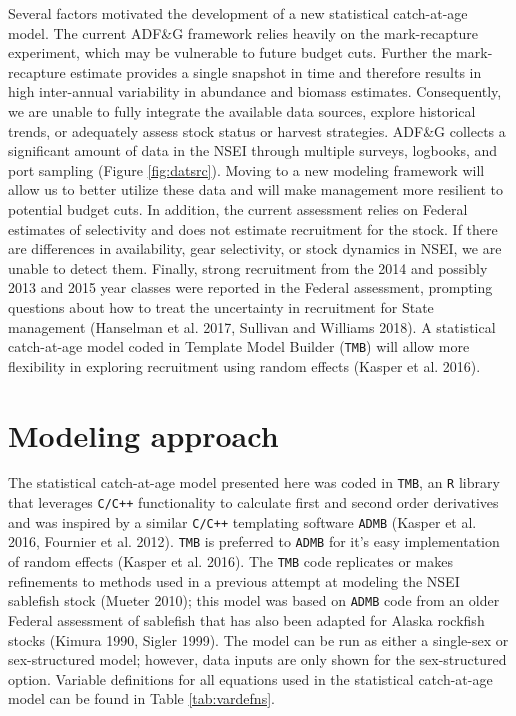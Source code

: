 \documentclass[]{article}
\begin{document}
Several factors motivated the development of a new statistical
catch-at-age model. The current ADF\&G framework relies heavily on the
mark-recapture experiment, which may be vulnerable to future budget
cuts. Further the mark-recapture estimate provides a single snapshot in
time and therefore results in high inter-annual variability in abundance
and biomass estimates. Consequently, we are unable to fully integrate
the available data sources, explore historical trends, or adequately
assess stock status or harvest strategies. ADF\&G collects a significant
amount of data in the NSEI through multiple surveys, logbooks, and port
sampling (Figure \ref{fig:datsrc}). Moving to a new modeling framework
will allow us to better utilize these data and will make management more
resilient to potential budget cuts. In addition, the current assessment
relies on Federal estimates of selectivity and does not estimate
recruitment for the stock. If there are differences in availability,
gear selectivity, or stock dynamics in NSEI, we are unable to detect
them. Finally, strong recruitment from the 2014 and possibly 2013 and
2015 year classes were reported in the Federal assessment, prompting
questions about how to treat the uncertainty in recruitment for State
management (Hanselman et al. 2017, Sullivan and Williams 2018). A
statistical catch-at-age model coded in Template Model Builder
(\texttt{TMB}) will allow more flexibility in exploring recruitment
using random effects (Kasper et al. 2016).

\section{Modeling approach}\label{modeling-approach}

The statistical catch-at-age model presented here was coded in
\texttt{TMB}, an \texttt{R} library that leverages \texttt{C/C++}
functionality to calculate first and second order derivatives and was
inspired by a similar \texttt{C/C++} templating software \texttt{ADMB}
(Kasper et al. 2016, Fournier et al. 2012). \texttt{TMB} is preferred to
\texttt{ADMB} for it's easy implementation of random effects (Kasper et
al. 2016). The \texttt{TMB} code replicates or makes refinements to
methods used in a previous attempt at modeling the NSEI sablefish stock
(Mueter 2010); this model was based on \texttt{ADMB} code from an older
Federal assessment of sablefish that has also been adapted for Alaska
rockfish stocks (Kimura 1990, Sigler 1999). The model can be run as
either a single-sex or sex-structured model; however, data inputs are
only shown for the sex-structured option. Variable definitions for all
equations used in the statistical catch-at-age model can be found in
Table \ref{tab:vardefns}.
\end{document}
